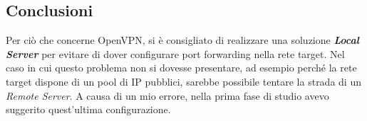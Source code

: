 \subsection{Conclusioni}
Per ciò che concerne OpenVPN, si è consigliato di realizzare una soluzione \textbf{\textit{Local Server}} per
evitare di dover configurare port forwarding nella rete target. Nel caso in cui questo
problema non si dovesse presentare, ad esempio perché la rete target dispone di un
pool di IP pubblici, sarebbe possibile tentare la strada di un \textit{Remote Server}.
A causa di un mio errore, nella prima fase di studio avevo suggerito quest'ultima configurazione.
